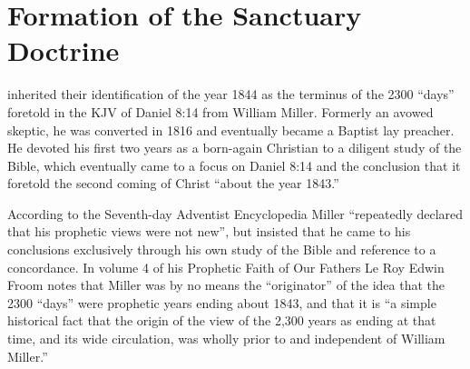 \chapter{Formation of the Sanctuary Doctrine}
\label{ch:formation}

 inherited their identification of the year
1844 as the terminus of the 2300 ``days'' foretold in the KJV of Daniel 8:14
from William Miller. Formerly an avowed skeptic, he was converted in 1816
and eventually became a Baptist lay preacher. He devoted his first two years 
as a born-again Christian to a diligent study of the Bible, which eventually
came to a focus on Daniel 8:14 and the conclusion that it foretold the
second coming of Christ ``about the year 1843.''

According to the Seventh-day Adventist Encyclopedia Miller ``repeatedly
declared that his prophetic views were not new'', but insisted that he came
to his conclusions exclusively through his own study of the Bible and
reference to a concordance. In volume 4 of his Prophetic Faith of Our
Fathers Le Roy Edwin Froom notes that Miller was by no means the
``originator'' of the idea that the 2300 ``days'' were prophetic years ending
about 1843, and that it is ``a simple historical fact that the origin of the
view of the 2,300 years as ending at that time, and its wide circulation,
was wholly prior to and independent of William Miller.''

